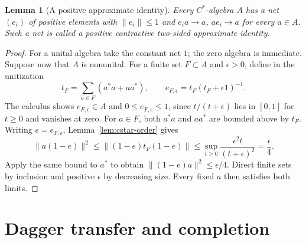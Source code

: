 \documentclass[11pt]{article}
\newtheorem{lemma}[theorem]{Lemma}
\theoremstyle{definition}
\theoremstyle{remark}
\numberwithin{equation}{section}
\begin{document}
\begin{lemma}[A positive approximate identity]
\label{lem:cstar-approximate}
Every $C^*$-algebra $A$ has a net $(e_i)$ of positive elements with
$\|e_i\|\leq1$ and $e_i a\to a$, $a e_i\to a$ for every $a\in A$.
Such a net is called a positive contractive two-sided approximate identity.
\end{lemma}

\begin{proof}
For a unital algebra take the constant net $1$; the zero algebra is
immediate.  Suppose now that $A$ is nonunital.  For a finite set
$F\subset A$ and $\epsilon>0$, define in the unitization
\[
 t_F=\sum_{a\in F}(a^*a+aa^*),\qquad
 e_{F,\epsilon}=t_F(t_F+\epsilon1)^{-1}.
\]
The calculus shows $e_{F,\epsilon}\in A$ and
$0\leq e_{F,\epsilon}\leq1$, since $t/(t+\epsilon)$ lies in $[0,1]$
for $t\geq0$ and vanishes at zero.
For $a\in F$, both $a^*a$ and $aa^*$ are bounded above by $t_F$.
Writing $e=e_{F,\epsilon}$, Lemma~\ref{lem:cstar-order} gives
\[
 \|a(1-e)\|^2\leq\|(1-e)t_F(1-e)\|
 \leq\sup_{t\geq0}\frac{\epsilon^2 t}{(t+\epsilon)^2}
 =\frac\epsilon4.
\]
Apply the same bound to $a^*$ to obtain $\|(1-e)a\|^2\leq\epsilon/4$.
Direct finite sets by inclusion and positive $\epsilon$ by decreasing size.
Every fixed $a$ then satisfies both limits.
\end{proof}


\section{Dagger transfer and completion}
\end{document}
